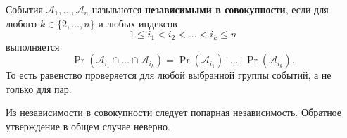 \begin{definition}
    События $\mathcal{A}_1,\dots,\mathcal{A}_n$
    называются \textbf{независимыми в совокупности}, если
    для любого $k \in \{2,\dots,n\}$ и любых индексов
    \[
        1 \leq i_1 < i_2 < \dots < i_k \leq n
    \]
    выполняется
    \[
        \Pr(\mathcal{A}_{i_1} \cap \dots \cap \mathcal{A}_{i_k})
        =
        \Pr(\mathcal{A}_{i_1})\cdot\ldots\cdot
        \Pr(\mathcal{A}_{i_k}).
    \]
    То есть равенство проверяется для любой выбранной группы
    событий, а не только для пар.
\end{definition}

\begin{exercise}[Замечание]
    Из независимости в совокупности следует попарная независимость.
    Обратное утверждение в общем случае неверно.
\end{exercise}

